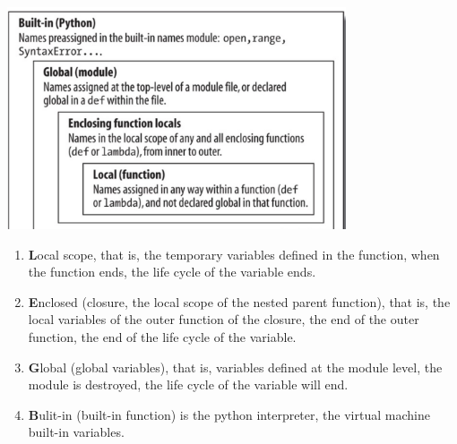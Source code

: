 \documentclass[a4paper]{exam}
\begin{document}
\includegraphics[width=10cm]{img/Snipaste_2021-04-24_02-41-32.png}
\begin{enumerate}
  \item \textbf{L}ocal scope,  that is, the temporary variables defined in the function, when the function ends, the life cycle of the variable ends.

  \item \textbf{E}nclosed (closure, the local scope of the nested parent function), that is, the local variables of the outer function of the closure, the end of the outer function, the end of the life cycle of the variable.
  \item \textbf{G}lobal (global variables), that is, variables defined at the module level, the module is destroyed, the life cycle of the variable will end.
  \item \textbf{B}ulit-in (built-in function) is the python interpreter, the virtual machine built-in variables.
\end{enumerate}
\end{document}
